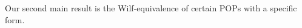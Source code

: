\documentclass[12pt, english, a4paper]{article}
\theoremstyle{plain}
\newtheorem{theorem}{Theorem}
\theoremstyle{definition}
\theoremstyle{remark}
\begin{document}


Our second main result is the Wilf-equivalence of certain POPs with a specific form.

		
		
		
		
\end{document}
